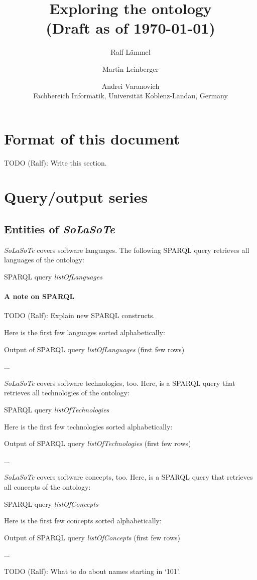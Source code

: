 \documentclass{article}
\title{Exploring the \solasote{} ontology\\
(Draft as of \today)}
\author{Ralf L\"ammel \and Martin Leinberger \and Andrei Varanovich\\
Fachbereich Informatik, Universit\"at Koblenz-Landau, Germany}
\newcommand{\todo}[2]{\noindent{}TODO (#1): #2}
\newcommand{\solasote}{{\itshape\textsf{SoLaSoTe}}}
\newcommand{\sparqlnote}[1]{
\paragraph{A note on SPARQL} #1
}
\newcommand{\sparql}[1]{%
\medskip

\noindent
\begin{boxedminipage}{\hsize}
\hfill{}SPARQL query \emph{#1}

\end{boxedminipage}
\medskip
}
\newcommand{\partialOutput}[2]{%

\medskip

\noindent
\begin{boxedminipage}{\hsize}
\hfill{}Output of SPARQL query \emph{#2} (first few rows)

{\large{}...}
\end{boxedminipage}
\medskip
}
\begin{document}
\maketitle


\section{Format of this document}

\todo{Ralf}{Write this section.}


\section{Query/output series}


\subsection{Entities of \solasote}

\solasote{} covers software languages. The following SPARQL query
retrieves all languages of the ontology:

\sparql{listOfLanguages}

\sparqlnote{\todo{Ralf}{Explain new SPARQL constructs.}}

\noindent
Here is the first few languages sorted alphabetically:

\partialOutput{7}{listOfLanguages}

\noindent
\solasote{} covers software technologies, too. Here, is a SPARQL query
that retrieves all technologies of the ontology:

\sparql{listOfTechnologies}

\noindent
Here is the first few technologies sorted alphabetically:

\partialOutput{7}{listOfTechnologies}

\noindent
\solasote{} covers software concepts, too. Here, is a SPARQL query
that retrieves all concepts of the ontology:

\sparql{listOfConcepts}

\noindent
Here is the first few concepts sorted alphabetically:

\partialOutput{7}{listOfConcepts}

\todo{Ralf}{What to do about names starting in `101'.}
\end{document}
